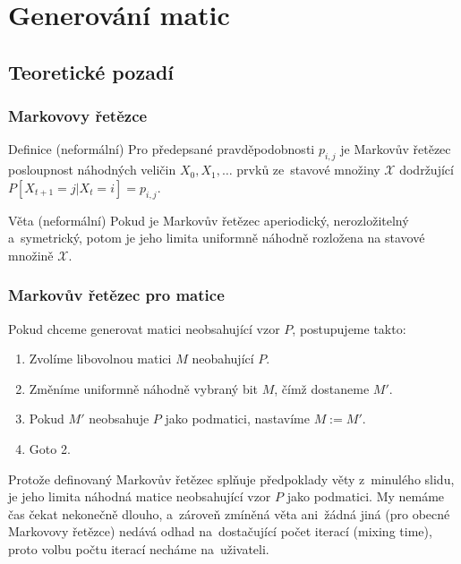 \documentclass{beamer}
\begin{document}
\section{Generování matic}
\subsection{Teoretické pozadí}
\begin{frame}
\frametitle{Markovovy řetězce}
\begin{block}{Definice (neformální)}
Pro předepsané pravděpodobnosti $p_{i,j}$ je \alert{Markovův řetězec} posloupnost náhodných veličin $X_0,X_1,\dots$ prvků ze~stavové množiny $\mathcal{X}$ dodržující $P[X_{t+1}=j|X_t=i]=p_{i,j}.$
\end{block}
\pause
\begin{block}{Věta (neformální)}
Pokud je Markovův řetězec aperiodický, nerozložitelný a~symetrický, potom je jeho limita uniformně náhodně rozložena na stavové množině $\mathcal{X}$.
\end{block}
\end{frame}

\begin{frame}
\frametitle{Markovův řetězec pro matice}
Pokud chceme generovat matici neobsahující vzor $P$, postupujeme takto:
\begin{enumerate}
\item Zvolíme libovolnou matici $M$ neobahující $P$.
\item Změníme uniformně náhodně vybraný bit $M$, čímž dostaneme $M'$.
\item \alert{Pokud $M'$ neobsahuje $P$ jako podmatici}, nastavíme $M:=M'$.
\item Goto 2.
\end{enumerate}
\vspace{1em}
\pause
Protože definovaný Markovův řetězec splňuje předpoklady věty z~minulého slidu, je jeho limita náhodná matice neobsahující vzor $P$ jako podmatici. My nemáme čas čekat nekonečně dlouho, a~zároveň zmíněná věta ani~žádná jiná (pro obecné Markovovy řetězce) nedává odhad na~dostačující počet iterací (mixing time), proto volbu počtu iterací necháme na~uživateli.
\end{frame}
\end{document}
